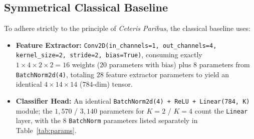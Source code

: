 \documentclass[runningheads]{llncs}
\begin{document}
\subsection{Symmetrical Classical Baseline}
To adhere strictly to the principle of \textit{Ceteris Paribus}, the classical baseline uses:
\begin{itemize}
    \item \textbf{Feature Extractor:} \texttt{Conv2D(in\_channels=1, out\_channels=4, kernel\_size=2, stride=2, bias=True)}, consuming exactly $1 \times 4 \times 2 \times 2 = 16$ weights ($20$ parameters with bias) plus $8$ parameters from \texttt{BatchNorm2d(4)}, totaling $28$ feature extractor parameters to yield an identical $4 \times 14 \times 14$ ($784$-dim) tensor.
    \item \textbf{Classifier Head:} An identical \texttt{BatchNorm2d(4) + ReLU + Linear(784, K)} module; the $1{,}570$ / $3{,}140$ parameters for $K=2$ / $K=4$ count the \texttt{Linear} layer, with the $8$ \texttt{BatchNorm} parameters listed separately in Table~\ref{tab:params}.
\end{itemize}

\begin{table}[t]
\caption{Parameter breakdown between feature extractors and classifier heads.}
\label{tab:params}
\centering
\small
{}
\end{table}
\end{document}
